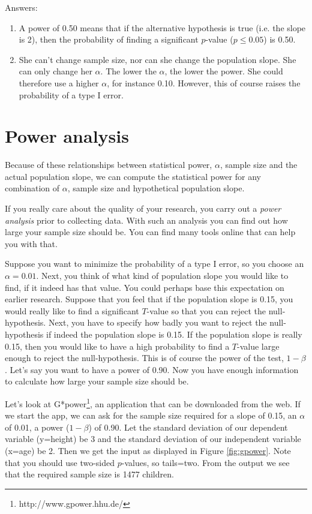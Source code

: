 \documentclass[]{book}\usepackage[]{graphicx}\usepackage[]{color}
\begin{document}
Answers:

\begin{enumerate}

\item A power of 0.50 means that if the alternative hypothesis is true (i.e. the slope is 2), then the probability of finding a significant $p$-value ($p \leq 0.05$) is 0.50.

\item She can't change sample size, nor can she change the population slope. She can only change her $\alpha$. The lower the $\alpha$, the lower the power. She could therefore use a higher $\alpha$, for instance 0.10. However, this of course raises the probability of a type I error.


\end{enumerate}


\section{Power analysis}
Because of these relationships between statistical power, $\alpha$, sample size and the actual population slope, we can compute the statistical power for any combination of $\alpha$, sample size and hypothetical population slope.


If you really care about the quality of your research, you carry out a \textit{power analysis} prior to collecting data. With such an analysis you can find out how large your sample size should be. You can find many tools online that can help you with that.

Suppose you want to minimize the probability of a type I error, so you choose an $\alpha=0.01$. Next, you think of what kind of population slope you would like to find, if it indeed has that value. You could perhaps base this expectation on earlier research. Suppose that you feel that if the population slope is 0.15, you would really like to find a significant $T$-value so that you can reject the null-hypothesis. Next, you have to specify how badly you want to reject the null-hypothesis if indeed the population slope is 0.15. If the population slope is really 0.15, then you would like to have a high probability to find a $T$-value large enough to reject the null-hypothesis. This is of course the power of the test, $1-\beta$. Let's say you want to have a power of 0.90. Now you have enough information to calculate how large your sample size should be.

Let's look at G*power\footnote{http://www.gpower.hhu.de/}, an application that can be downloaded from the web. If we start the app, we can ask for the sample size required for a slope of 0.15, an $\alpha$ of 0.01, a power ($1-\beta$) of 0.90. Let the standard deviation of our dependent variable (y=height) be 3 and the standard deviation of our independent variable (x=age) be 2. Then we get the input as displayed in Figure \ref{fig:gpower}. Note that you should use two-sided $p$-values, so tails=two. From the output we see that the required sample size is 1477 children.
\end{document}
